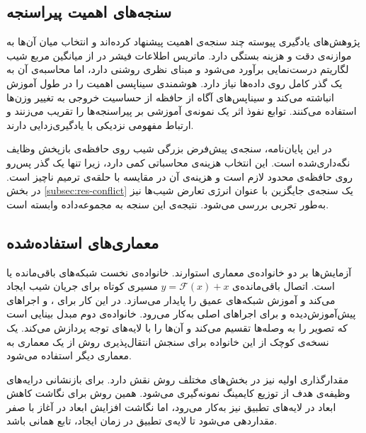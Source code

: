 \subsection{سنجه‌های اهمیت پیراسنجه}
\label{subsec:lit-importance}

پژوهش‌های یادگیری پیوسته چند سنجه‌ی اهمیت پیشنهاد کرده‌اند و انتخاب میان آن‌ها به موازنه‌ی دقت و هزینه بستگی دارد. {ماتریس اطلاعات فیشر} در  \cite{kirkpatrick2017overcoming} از میانگین مربع شیب لگاریتم {درست‌نمایی} برآورد می‌شود و مبنای نظری روشنی دارد، اما محاسبه‌ی آن به یک گذر کامل روی داده‌ها نیاز دارد. {هوشمندی سیناپسی} \cite{zenke2017continual} اهمیت را در طول آموزش انباشته می‌کند و {سیناپس‌های آگاه از حافظه} \cite{aljundi2018memory} از حساسیت خروجی به تغییر وزن‌ها استفاده می‌کنند. {توابع نفوذ} \cite{koh2017influence} اثر یک نمونه‌ی آموزشی بر پیراسنجه‌ها را تقریب می‌زنند و ارتباط مفهومی نزدیکی با یادگیری‌زدایی دارند.

در این پایان‌نامه، سنجه‌ی پیش‌فرض بزرگی شیب روی حافظه‌ی بازپخش وظایف نگه‌داری‌شده است. این انتخاب هزینه‌ی محاسباتی کمی دارد، زیرا تنها یک {گذر پس‌رو} روی حافظه‌ی محدود لازم است و هزینه‌ی آن در مقایسه با حلقه‌ی ترمیم ناچیز است. در بخش \ref{subsec:res-conflict} یک سنجه‌ی جایگزین با عنوان {انرژی تعارض شیب‌ها} نیز به‌طور تجربی بررسی می‌شود. نتیجه‌ی این سنجه به مجموعه‌داده وابسته است.

\subsection{معماری‌های استفاده‌شده}
\label{subsec:lit-arch}

آزمایش‌ها بر دو خانواده‌ی معماری استوارند. خانواده‌ی نخست {شبکه‌های باقی‌مانده} یا  \cite{he2016deep} است. اتصال باقی‌مانده‌ی $y=\mathcal{F}(x)+x$ مسیری کوتاه برای جریان شیب ایجاد می‌کند و آموزش شبکه‌های عمیق را پایدار می‌سازد. در این کار  برای ،  و اجراهای پیش‌آموزش‌دیده و  برای اجراهای اصلی  به‌کار می‌رود. خانواده‌ی دوم {مبدل بینایی} \cite{dosovitskiy2021vit} است که تصویر را به {وصله‌ها} تقسیم می‌کند و آن‌ها را با {لایه‌های توجه} پردازش می‌کند. یک نسخه‌ی کوچک از این خانواده برای سنجش انتقال‌پذیری روش از یک معماری به معماری دیگر استفاده می‌شود.

مقدارگذاری اولیه نیز در بخش‌های مختلف روش نقش دارد. برای بازنشانی درایه‌های وظیفه‌ی هدف از توزیع {کایمینگ} \cite{he2015delving} نمونه‌گیری می‌شود. همین روش برای نگاشت کاهش ابعاد در لایه‌های تطبیق نیز به‌کار می‌رود، اما نگاشت افزایش ابعاد در آغاز با صفر مقداردهی می‌شود تا لایه‌ی تطبیق در زمان ایجاد، تابع همانی باشد.

